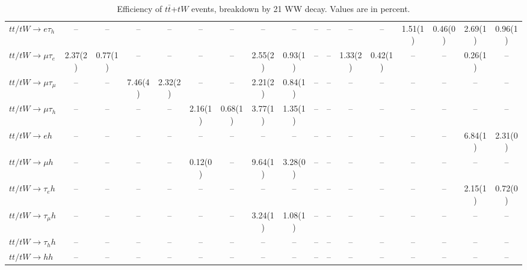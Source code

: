 \begin{sidewaystable}[p]
\begin{tabular}{|l|cc|cc|cc|cc|cc|cc|cc|cc|}
    $tt/tW \to e\tau_{h}$              &    --    &    --    &    --    &    --    &    --    &    --    &    --    &    --    &    --    &    --    &    --    &    --    &  1.51(1) &  0.46(0) &  2.69(1) &  0.96(1) \\ 
    $tt/tW \to \mu\tau_{e}$            &  2.37(2) &  0.77(1) &    --    &    --    &    --    &    --    &  2.55(2) &  0.93(1) &    --    &    --    &  1.33(2) &  0.42(1) &    --    &    --    &  0.26(1) &    --    \\ 
    $tt/tW \to \mu\tau_{\mu}$          &    --    &    --    &  7.46(4) &  2.32(2) &    --    &    --    &  2.21(2) &  0.84(1) &    --    &    --    &    --    &    --    &    --    &    --    &    --    &    --    \\ 
    $tt/tW \to \mu\tau_{h}$            &    --    &    --    &    --    &    --    &  2.16(1) &  0.68(1) &  3.77(1) &  1.35(1) &    --    &    --    &    --    &    --    &    --    &    --    &    --    &    --    \\ 
    $tt/tW \to eh$                     &    --    &    --    &    --    &    --    &    --    &    --    &    --    &    --    &    --    &    --    &    --    &    --    &    --    &    --    &  6.84(1) &  2.31(0) \\ 
    $tt/tW \to \mu h$                  &    --    &    --    &    --    &    --    &  0.12(0) &    --    &  9.64(1) &  3.28(0) &    --    &    --    &    --    &    --    &    --    &    --    &    --    &    --    \\ 
    $tt/tW \to \tau_{e}h$              &    --    &    --    &    --    &    --    &    --    &    --    &    --    &    --    &    --    &    --    &    --    &    --    &    --    &    --    &  2.15(1) &  0.72(0) \\ 
    $tt/tW \to \tau_{\mu}h$            &    --    &    --    &    --    &    --    &    --    &    --    &  3.24(1) &  1.08(1) &    --    &    --    &    --    &    --    &    --    &    --    &    --    &    --    \\ 
    $tt/tW \to \tau_{h}h$              &    --    &    --    &    --    &    --    &    --    &    --    &    --    &    --    &    --    &    --    &    --    &    --    &    --    &    --    &    --    &    --    \\ 
    $tt/tW \to hh$                     &    --    &    --    &    --    &    --    &    --    &    --    &    --    &    --    &    --    &    --    &    --    &    --    &    --    &    --    &    --    &    --    \\ 

    \hline
    \end{tabular}
    \caption{Efficiency of $t\bar{t}$+$tW$ events, breakdown by 21 WW decay.  Values are in percent.}
    \label{sigcomp}
    
\end{sidewaystable}
